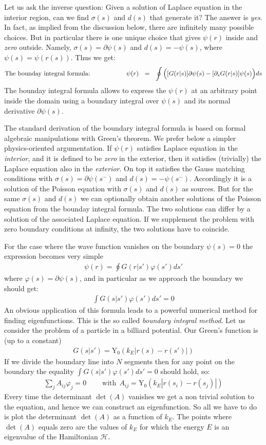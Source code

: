 \documentclass[onecolumn,fleqn]{revtex4}
\newcommand{\beq}{\begin{eqnarray}}
\newcommand{\eeq}{\end{eqnarray}}
\begin{document}
Let us ask the inverse question: 
Given a solution of Laplace equation 
in the interior region, can we find $\sigma(s)$ 
and $d(s)$ that generate it? The answer is {\em yes}. 
In fact, as implied from the discussion below, 
there are infinitely many possible choices. 
But in particular there is one unique choice that 
gives $\psi(r)$ inside and {\em zero} outside.
Namely, ${\sigma(s)=\partial \psi(s)}$ and ${d(s)=-\psi(s)}$, 
where $\psi(s) = \psi(r(s))$. Thus we get: 
\beq
\mbox{The bounday integral formula:} 
\hspace*{2cm} 
\psi(r) \ \ = \ \ 
\oint \Big( [G(r|s)] \partial\psi(s) - [\partial_s G(r|s)] \psi(s) \Big) ds
\eeq
The bounday integral formula allows to express the $\psi(r)$ 
at an arbitrary point inside the domain 
using a boundary integral over $\psi(s)$ 
and its normal derivative $\partial \psi(s)$.


The standard derivation of the boundary integral formula
is based on formal algebraic manipulations with Green's theorem. 
We prefer below a simpler physics-oriented argumentation. 
If $\psi(r)$ satisfies Laplace equation in the {\em interior},  
and it is defined to be {\em zero} in the exterior, 
then it satisfies (trivially) the Laplace equation also 
in the {\em exterior}. On top it satisfies the Gauss matching 
conditions with ${\sigma(s)=\partial \psi(s^{-})}$ and ${d(s)=-\psi(s^{-})}$. 
Accordingly it is a solution of the Poisson equation
with $\sigma(s)$ and $d(s)$ as sources. 
But for the same $\sigma(s)$ and $d(s)$ we can optionally 
obtain another solutions of the Poisson equation
from the bounday integral formula. 
The two solutions can differ by 
a solution of the associated Laplace equation.  
If we supplement the problem with zero boundary conditions 
at infinity, the two solutions have to coincide.  



For the case where the wave function vanishes 
on the boundary $\psi(s)=0$
the expression becomes very simple
\beq
\psi(r) = \oint G(r|s') \varphi(s') ds'
\eeq
where $\varphi(s)=\partial\psi(s)$, 
and in particular as we approach 
the boundary we should get: 
\beq
\int G(s|s')\varphi(s')ds' = 0
\eeq
An obvious application of this formula 
leads to a powerful numerical method 
for finding eigenfunctions. This is 
the so called \textit{boundary integral method}.
Let us consider the problem of a
particle in a billiard potential. 
Our Green's function is (up to a constant) 
\beq
G(s|s')=\mathrm{Y_0}(k_E|r(s)-r(s')|)
\eeq
If we divide the boundary line into $N$ segments 
then for any point on the boundary the 
equality $\int G(s|s')\varphi(s')ds' = 0$ should hold, so:
\beq
\sum_j A_{ij} \varphi_j = 0
\ \ \ \ \ \ \ \ \ \ \mbox{with} \ \ 
A_{ij} = \mathrm{Y_0}(k_E|r(s_i)-r(s_j)|) 
\eeq
Every time the determinant $\det(A)$
vanishes we get a non trivial solution 
to the equation, and hence we can construct 
an eigenfunction. So all we have to do is 
plot the determinant $\det(A)$ as a function of $k_E$. 
The points where $\det(A)$ equals zero are the values of $k_E$
for which the energy $E$ is an eigenvalue of the Hamiltonian $\mathcal{H}$.
\end{document}
